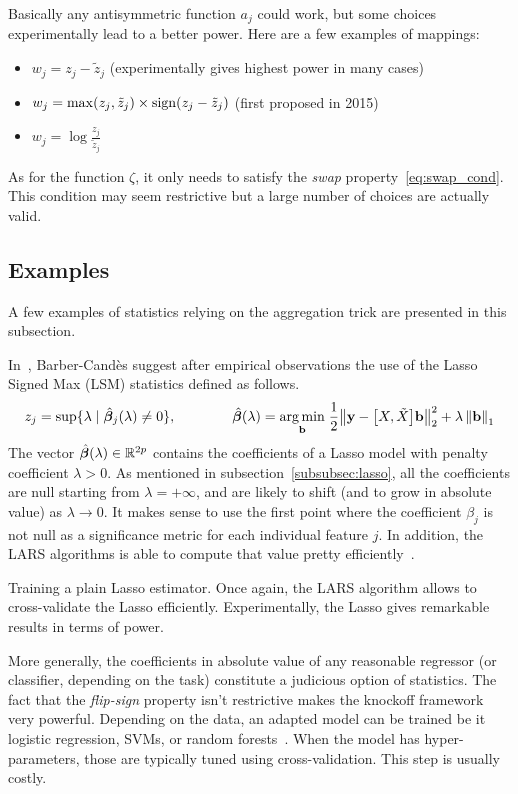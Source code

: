 Basically any antisymmetric function $a_j$ could work, but some choices experimentally lead to a better power.
Here are a few examples of mappings:
\begin{itemize}
    \item $w_j = z_j - \tilde{z}_j$ (experimentally gives highest power in many cases)
    \item $w_j = \max(z_j, \tilde{z}_j) \times \operatorname*{sign}(z_j - \tilde{z}_j)$ (first proposed in 2015)
    \item $w_j = \log\frac{z_j}{\tilde{z}_j}$
\end{itemize}
As for the function $\zeta$, it only needs to satisfy the \emph{swap} property~\ref{eq:swap_cond}.
This condition may seem restrictive but a large number of choices are actually valid.

\subsection{Examples}\label{subsec:sce}

A few examples of statistics relying on the aggregation trick are presented in this subsection.

In~\cite{fixed_x_knockoffs}, Barber-Candès suggest after empirical observations the use of the
Lasso Signed Max (LSM) statistics defined as follows.
\begin{equation}
    z_j = \sup\{\lambda \mid \hat{\bm{\beta}}_j(\lambda) \neq 0\}
    ,\qquad\qquad
    \hat{\bm{\beta}}(\lambda) =
    \underset{\mathbf{b}}{\operatorname*{arg\,min}}\;
    \frac{1}{2}\big\lVert \mathbf{y} - \big[ X, \tilde{X} \big]\mathbf{b} \big\rVert_2^2 + \lambda\left\lVert\mathbf{b}\right\rVert_1
\end{equation}
The vector $\hat{\bm{\beta}}(\lambda) \in \mathbb{R}^{2p}$ contains the coefficients of a Lasso model
with penalty coefficient $\lambda > 0$.
As mentioned in subsection~\ref{subsubsec:lasso},
all the coefficients are null starting from $\lambda = +\infty$,
and are likely to shift (and to grow in absolute value) as $\lambda \to 0$.
It makes sense to use the first point where the coefficient $\beta_j$ is not null
as a significance metric for each individual feature $j$.
In addition, the LARS algorithms is able to compute that value pretty efficiently~\cite{lars_complexity}.

Training a plain Lasso estimator.
Once again, the LARS algorithm allows to cross-validate the Lasso efficiently.
Experimentally, the Lasso gives remarkable results in terms of power.

More generally, the coefficients in absolute value of any reasonable regressor
(or classifier, depending on the task) constitute a judicious option of statistics.
The fact that the \emph{flip-sign} property isn't restrictive makes the knockoff framework very powerful.
Depending on the data, an adapted model can be trained be it logistic regression,
SVMs, or random forests~\cite{random_forests}.
When the model has hyper-parameters, those are typically tuned using cross-validation.
This step is usually costly.

